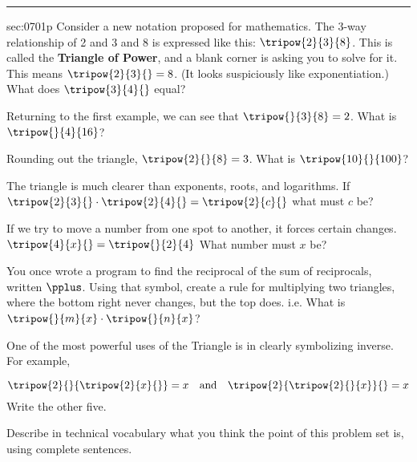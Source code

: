 \renewcommand{\columnseprule}{1.5pt}
\begin{multicols*}{2}
\rule[0.4\baselineskip]{0.4\textwidth}{1pt}
\noindent
{}\label{sec:0701p}
\begin{exercises}{sec:0701p}
\lab[]  Consider a new notation proposed for mathematics.  The 3-way relationship of 2 and 3 and 8 is expressed like this: $\tripow{2}{3}{8}$.  This is called the \textbf{Triangle of Power}, and a blank corner is asking you to solve for it.  This means $\tripow{2}{3}{} = 8$.  (It looks suspiciously like exponentiation.)  What does $\tripow{3}{4}{}$ equal?

\vspace{3cm}
\noindent
\lab[]  Returning to the first example, we can see that $\tripow{}{3}{8}=2$.   What is $\tripow{}{4}{16}$?

\vspace{3cm}
\noindent
\lab[]  Rounding out the triangle, $\tripow{2}{}{8}=3$.  What is $\tripow{10}{}{100}$?

\vspace{3cm}
\noindent
\lab[]  The triangle is much clearer than exponents, roots, and logarithms.  If $\tripow{2}{3}{} \cdot \tripow{2}{4}{} = \tripow{2}{c}{}$ what must $c$ be?

\vspace{3cm}
\noindent
\lab[]  If we try to move a number from one spot to another, it forces certain changes.  $\tripow{4}{x}{} = \tripow{}{2}{4}$  What number must $x$ be?  

\vspace{3cm}
\noindent
\lab[]  You once wrote a program to find the reciprocal of the sum of reciprocals, written $\pplus$.  Using that symbol, create a rule for multiplying two triangles, where the bottom right never changes, but the top does.  i.e. What is $\tripow{}{m}{x}\cdot{}\tripow{}{n}{x}$?

\vspace{3cm}
\noindent
\lab[]  One of the most powerful uses of the Triangle is in clearly symbolizing inverse.  For example,

$$\tripow{2}{}{\tripow{2}{x}{}} = x \quad \text{and} \quad \tripow{2}{\tripow{2}{}{x}}{} = x$$  Write the other
five.

\vspace{8cm}

\lab[]Describe in technical vocabulary what you think the point of this problem set is, using 
complete sentences.
\end{exercises}
\end{multicols*}